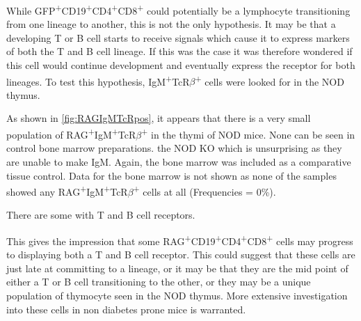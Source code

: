 While GFP\textsuperscript{+}CD19\textsuperscript{+}CD4\textsuperscript{+}CD8\textsuperscript{+} could potentially be a lymphocyte transitioning from one lineage to another, this is not the only hypothesis.
It may be that a developing T or B cell starts to receive signals which cause it to express markers of both the T and B cell lineage.
If this was the case it was therefore wondered if this cell would continue development and eventually express the receptor for both lineages.
To test this hypothesis, IgM\textsuperscript{+}TcR$\beta$\textsuperscript{+} cells were looked for in the NOD thymus.


As shown in \cref{fig:RAGIgMTcRpos}, it appears that there is a very small population of RAG\textsuperscript{+}IgM\textsuperscript{+}TcR$\beta$\textsuperscript{+} in the thymi of NOD  mice.
None can be seen in control bone marrow preparations. 
the NOD KO which is unsurprising as they are unable to make IgM.
Again, the bone marrow was included as a comparative tissue control.
Data for the bone marrow is not shown as none of the samples showed any RAG\textsuperscript{+}IgM\textsuperscript{+}TcR$\beta$\textsuperscript{+} cells at all (Frequencies = 0\%).

There are some with T and B cell receptors.

This gives the impression that some RAG\textsuperscript{+}CD19\textsuperscript{+}CD4\textsuperscript{+}CD8\textsuperscript{+} cells may progress to displaying both a T and B cell receptor.
This could suggest that these cells are just late at committing to a lineage, or it may be that they are the mid point of either a T or B cell transitioning to the other, or they may be a unique population of thymocyte seen in the NOD thymus.
More extensive investigation into these cells in non diabetes prone mice is warranted.


